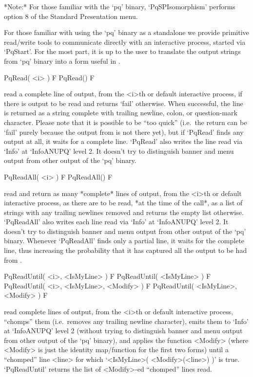 *Note:* For  those  familiar  with  the  `pq'  binary,  `PqSPIsomorphism'
performs option 8 of the Standard Presentation menu.


For those familiar with using the `pq' binary as a standalone we  provide
primitive read/write tools to communicate directly  with  an  interactive
{\ANUPQ} process, started via `PqStart'. For the most part, it is  up  to
the user to translate the output strings from `pq'  binary  into  a  form
useful in {\GAP}.

\>PqRead( <i> ) F
\>PqRead() F

read a complete line of  {\ANUPQ}  output,  from  the  <i>th  or  default
interactive {\ANUPQ} process, if there is output to be read  and  returns
`fail' otherwise. When successful, the  line  is  returned  as  a  string
complete with trailing newline, colon, or question-mark character. Please
note that it is possible to be ``too  quick''  (i.e.~the  return  can  be
`fail' purely because the output from {\ANUPQ} is not there yet), but  if
`PqRead' finds any output at all, it waits for a complete line.  `PqRead'
also writes the line read via `Info' at `InfoANUPQ' level 2.  It  doesn't
try to distinguish banner and menu output from other output of  the  `pq'
binary.

\>PqReadAll( <i> ) F
\>PqReadAll() F

read and return as many *complete* lines of  {\ANUPQ}  output,  from  the
<i>th or default interactive {\ANUPQ} process, as there are to  be  read,
*at the time of the call*,  as  a  list  of  strings  with  any  trailing
newlines removed and returns the empty list otherwise.  `PqReadAll'  also
writes each line read via `Info' at `InfoANUPQ' level 2. It  doesn't  try
to distinguish banner and menu output  from  other  output  of  the  `pq'
binary. Whenever `PqReadAll' finds only a partial line, it waits for  the
complete line, thus increasing the probability that it has  captured  all
the output to be had from {\ANUPQ}.

\>PqReadUntil( <i>, <IsMyLine> ) F
\>PqReadUntil( <IsMyLine> ) F
\>PqReadUntil( <i>, <IsMyLine>, <Modify> ) F
\>PqReadUntil( <IsMyLine>, <Modify> ) F

read complete lines  of  {\ANUPQ}  output,  from  the  <i>th  or  default
interactive {\ANUPQ} process, ``chomps'' them (i.e.~removes any  trailing
newline character), emits them to `Info' at `InfoANUPQ' level 2  (without
trying to distinguish banner and menu output from  other  output  of  the
`pq' binary), and applies the function <Modify> (where <Modify>  is  just
the identity map/function for the first two forms)  until  a  ``chomped''
line  <line>  for  which  `<IsMyLine>(  <Modify>(<line>)  )'   is   true.
`PqReadUntil' returns the list of <Modify>-ed ``chomped'' lines read.

